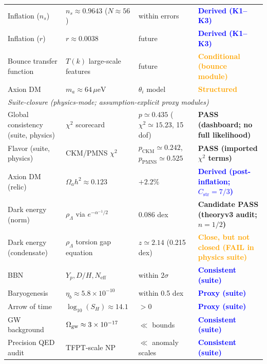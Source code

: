 \begin{longtable}{@{}p{3cm}p{4cm}p{3cm}p{5.2cm}@{}}
\quad Inflation ($n_s$) & $n_s \approx 0.9643$ ($N\approx 56$) & within errors & \textcolor{blue}{\textbf{Derived (K1--K3)}}\\
\quad Inflation ($r$) & $r \approx 0.0038$ & future & \textcolor{blue}{\textbf{Derived (K1--K3)}}\\
\quad Bounce transfer function & $T(k)$ large-scale features & future & \textcolor{orange}{\textbf{Conditional (bounce module)}}\\
\quad Axion DM & $m_a \approx 64\,\mu\text{eV}$ & $\theta_i$ model & \textcolor{orange}{\textbf{Structured}}\\
\midrule
\multicolumn{4}{l}{\textit{Suite-closure (physics-mode; assumption-explicit proxy modules)}}\\
\quad Global consistency (suite, physics) & $\chi^2$ scorecard & $p\simeq 0.435$ ($\chi^2\simeq 15.23$, 15 dof) & \textcolor{green!60!black}{\textbf{PASS (dashboard; no full likelihood)}}\\
\quad Flavor (suite, physics) & CKM/PMNS $\chi^2$ & $p_{\mathrm{CKM}}\simeq 0.242$, $p_{\mathrm{PMNS}}\simeq 0.525$ & \textcolor{green!60!black}{\textbf{PASS (imported $\chi^2$ terms)}}\\
\quad Axion DM (relic) & $\Omega_a h^2 \approx 0.123$ & $+2.2\%$ & \textcolor{blue}{\textbf{Derived (post-inflation; $C_{\mathrm{str}}=7/3$)}}\\
\quad Dark energy (norm) & $\rho_\Lambda$ via $e^{-\alpha^{-1}/2}$ & 0.086 dex & \textcolor{green!60!black}{\textbf{Candidate PASS (theoryv3 audit; $n=1/2$)}}\\
\quad Dark energy (condensate) & $\rho_\Lambda$ torsion gap equation & $z\simeq 2.14$ (0.215 dex) & \textcolor{orange}{\textbf{Close, but not closed (FAIL in physics suite)}}\\
\quad BBN & $Y_p, D/H, N_\mathrm{eff}$ & within $2\sigma$ & \textcolor{blue}{\textbf{Consistent (suite)}}\\
\quad Baryogenesis & $\eta_b \approx 5.8\times10^{-10}$ & within 0.5 dex & \textcolor{blue}{\textbf{Proxy (suite)}}\\
\quad Arrow of time & $\log_{10}(S_H)\approx 14.1$ & $>0$ & \textcolor{blue}{\textbf{Proxy (suite)}}\\
\quad GW background & $\Omega_{\rm gw}\approx 3\times10^{-17}$ & $\ll$ bounds & \textcolor{blue}{\textbf{Consistent (suite)}}\\
\quad Precision QED audit & TFPT-scale NP & $\ll$ anomaly scales & \textcolor{blue}{\textbf{Consistent (suite)}}\\

\end{longtable}
